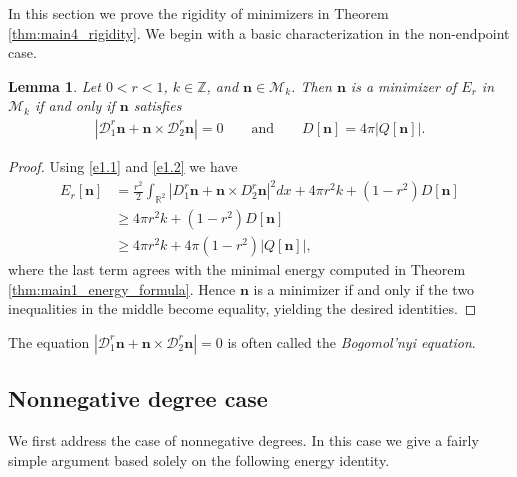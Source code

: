 \documentclass{amsart}
\numberwithin{equation}{section}
\newtheorem{lemma}[theorem]{Lemma}
\theoremstyle{definition}
\theoremstyle{remark}
\newcommand{\R}{\mathbb{R}}
\newcommand{\Z}{\mathbb{Z}}
\newcommand{\boD}{\mathcal{D}}
\newcommand{\boM}{\mathcal{M}}
\newcommand{\bn}{{\mathbf{n}}}
\begin{document}
In this section we prove the rigidity of minimizers in Theorem \ref{thm:main4_rigidity}.
We begin with a basic characterization in the non-endpoint case.

\begin{lemma}\label{lem:minimizer_necessary}
    Let $0<r<1$, $k\in\Z$, and $\bn\in\boM_k$.
    Then $\bn$ is a minimizer of $E_r$ in $\boM_k$ if and only if $\bn$ satisfies
    \begin{align*}
    |\boD^r_1\bn + \bn\times \boD^r_2\bn| = 0 \qquad \text{and} \qquad
    D[\bn] = 4\pi|Q[\bn]|.
    \end{align*}
\end{lemma}

\begin{proof}
    Using \eqref{e1.1} and \eqref{e1.2} we have
    \begin{align*}
    E_r[\bn] &= \frac {r^2}2 \int_{\R^2} |D^r_1\bn + \bn\times D^r_2\bn|^2 dx 
    + 4\pi r^2k + (1-r^2)D[\bn]\\
    &\ge 4\pi r^2k + (1-r^2)D[\bn]\\
    &\ge 4\pi r^2k + 4\pi(1-r^2)|Q[\bn]|,
    \end{align*}
    where the last term agrees with the minimal energy computed in Theorem \ref{thm:main1_energy_formula}.
    Hence $\bn$ is a minimizer if and only if the two 
    inequalities in the middle become equality, yielding the desired identities.
\end{proof}

The equation $|\boD^r_1\bn + \bn\times \boD^r_2\bn| = 0$ is often called the \emph{Bogomol'nyi equation}.

\subsection{Nonnegative degree case}

We first address the case of nonnegative degrees.
In this case we give a fairly simple argument based solely on the following energy identity.
\end{document}
